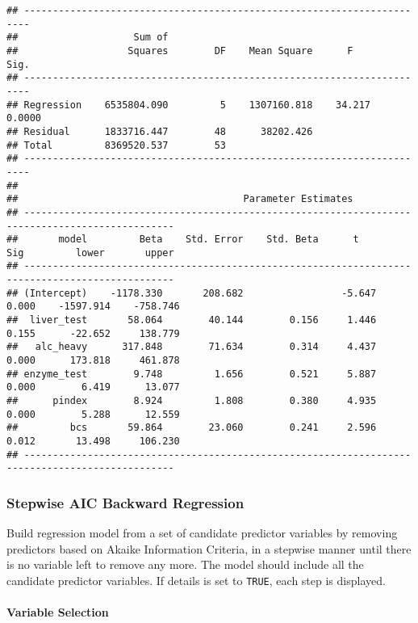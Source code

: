 \documentclass[
]{article}
\begin{document}
\begin{verbatim}
## -----------------------------------------------------------------------
##                    Sum of                                              
##                   Squares        DF    Mean Square      F         Sig. 
## -----------------------------------------------------------------------
## Regression    6535804.090         5    1307160.818    34.217    0.0000 
## Residual      1833716.447        48      38202.426                     
## Total         8369520.537        53                                    
## -----------------------------------------------------------------------
## 
##                                       Parameter Estimates                                        
## ------------------------------------------------------------------------------------------------
##       model         Beta    Std. Error    Std. Beta      t        Sig         lower       upper 
## ------------------------------------------------------------------------------------------------
## (Intercept)    -1178.330       208.682                 -5.647    0.000    -1597.914    -758.746 
##  liver_test       58.064        40.144        0.156     1.446    0.155      -22.652     138.779 
##   alc_heavy      317.848        71.634        0.314     4.437    0.000      173.818     461.878 
## enzyme_test        9.748         1.656        0.521     5.887    0.000        6.419      13.077 
##      pindex        8.924         1.808        0.380     4.935    0.000        5.288      12.559 
##         bcs       59.864        23.060        0.241     2.596    0.012       13.498     106.230 
## ------------------------------------------------------------------------------------------------
\end{verbatim}

\hypertarget{stepwise-aic-backward-regression}{%
\subsubsection{Stepwise AIC Backward
Regression}\label{stepwise-aic-backward-regression}}

Build regression model from a set of candidate predictor variables by
removing predictors based on Akaike Information Criteria, in a stepwise
manner until there is no variable left to remove any more. The model
should include all the candidate predictor variables. If details is set
to \texttt{TRUE}, each step is displayed.

\hypertarget{variable-selection-5}{%
\paragraph{Variable Selection}\label{variable-selection-5}}
\end{document}
